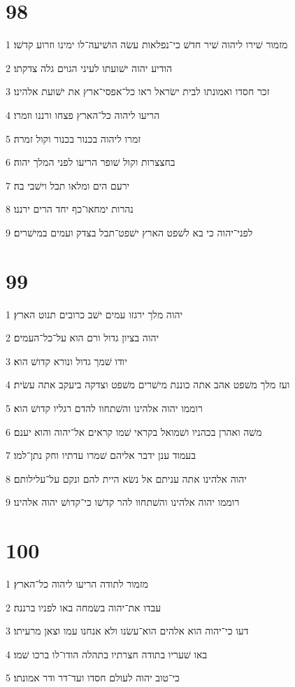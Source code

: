 \chapter{98}

\par 1 מזמור שׁירו ליהוה שׁיר חדשׁ כי־נפלאות עשׂה הושׁיעה־לו ימינו וזרוע קדשׁו׃
\par 2 הודיע יהוה ישׁועתו לעיני הגוים גלה צדקתו׃
\par 3 זכר חסדו ואמונתו לבית ישׂראל ראו כל־אפסי־ארץ את ישׁועת אלהינו׃
\par 4 הריעו ליהוה כל־הארץ פצחו ורננו וזמרו׃
\par 5 זמרו ליהוה בכנור בכנור וקול זמרה׃
\par 6 בחצצרות וקול שׁופר הריעו לפני המלך יהוה׃
\par 7 ירעם הים ומלאו תבל וישׁבי בה׃
\par 8 נהרות ימחאו־כף יחד הרים ירננו׃
\par 9 לפני־יהוה כי בא לשׁפט הארץ ישׁפט־תבל בצדק ועמים במישׁרים׃

\chapter{99}

\par 1 יהוה מלך ירגזו עמים ישׁב כרובים תנוט הארץ׃
\par 2 יהוה בציון גדול ורם הוא על־כל־העמים׃
\par 3 יודו שׁמך גדול ונורא קדושׁ הוא׃
\par 4 ועז מלך משׁפט אהב אתה כוננת מישׁרים משׁפט וצדקה ביעקב אתה עשׂית׃
\par 5 רוממו יהוה אלהינו והשׁתחוו להדם רגליו קדושׁ הוא׃
\par 6 משׁה ואהרן בכהניו ושׁמואל בקראי שׁמו קראים אל־יהוה והוא יענם׃
\par 7 בעמוד ענן ידבר אליהם שׁמרו עדתיו וחק נתן־למו׃
\par 8 יהוה אלהינו אתה עניתם אל נשׂא היית להם ונקם על־עלילותם׃
\par 9 רוממו יהוה אלהינו והשׁתחוו להר קדשׁו כי־קדושׁ יהוה אלהינו׃

\chapter{100}

\par 1 מזמור לתודה הריעו ליהוה כל־הארץ׃
\par 2 עבדו את־יהוה בשׂמחה באו לפניו ברננה׃
\par 3 דעו כי־יהוה הוא אלהים הוא־עשׂנו ולא אנחנו עמו וצאן מרעיתו׃
\par 4 באו שׁעריו בתודה חצרתיו בתהלה הודו־לו ברכו שׁמו׃
\par 5 כי־טוב יהוה לעולם חסדו ועד־דר ודר אמונתו׃

